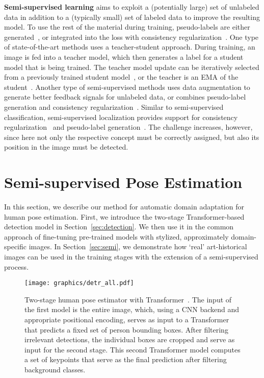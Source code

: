 \documentclass[sigconf]{acmart}
\begin{document}
\textbf{Semi-supervised learning} aims to exploit a (potentially large) set of unlabeled data in addition to a (typically small) set of labeled data to improve the resulting model.
To use the rest of the material during training, pseudo-labels are either generated~\cite{DBLP:conf/cvpr/XieLHL20, lee2013pseudo}, or integrated into the loss with consistency regularization~\cite{DBLP:conf/iclr/LaineA17, DBLP:journals/pami/MiyatoMKI19}. 
One type of state-of-the-art methods uses a teacher-student approach. 
During training, an image is fed into a teacher model, which then generates a label for a student model that is being trained. 
The teacher model update can be iteratively selected from a previously trained student model~\cite{DBLP:conf/cvpr/XieLHL20}, or the teacher is an \ac{EMA} of the student~\cite{DBLP:conf/iclr/TarvainenV17}. 
Another type of semi-supervised methods uses data augmentation to generate better feedback signals for unlabeled data, or combines pseudo-label generation and consistency regularization~\cite{DBLP:conf/nips/BerthelotCGPOR19, DBLP:conf/iclr/BerthelotCCKSZR20, DBLP:conf/nips/SohnBCZZRCKL20}. 
Similar to semi-supervised classification, semi-supervised localization provides support for consistency regularization~\cite{DBLP:conf/nips/JeongLKK19, DBLP:conf/wacv/TangRWXX21} and pseudo-label generation~\cite {DBLP:conf/iccv/Xu00WWWB021, DBLP:conf/cvpr/WangYZ0L18}. 
The challenge increases, however, since here not only the respective concept must be correctly assigned, but also its position in the image must be detected.



\section{Semi-supervised Pose Estimation}
\label{chp:method}

In this section, we describe our method for automatic domain adaptation for human pose estimation.
First, we introduce the two-stage Transformer-based detection model in Section~\ref{sec:detection}. We then use it in the common approach of fine-tuning pre-trained models with stylized, approximately domain-specific images.
In Section~\ref{sec:semi}, we demonstrate how \enquote*{real} art-historical images can be used in the training stages with the extension of a semi-supervised process.


\begin{figure*}
\begin{center}
\texttt{[image: graphics/detr\_all.pdf]}
\end{center}
\caption{Two-stage human pose estimator with Transformer~\cite{DBLP:conf/nips/VaswaniSPUJGKP17, DBLP:conf/eccv/CarionMSUKZ20}. 
The input of the first model is the entire image, which, using a \acf{CNN} backend and appropriate positional encoding, serves as input to a Transformer that predicts a fixed set of person bounding boxes. 
After filtering irrelevant detections, the individual boxes are cropped and serve as input for the second stage. 
This second Transformer model computes a set of keypoints that serve as the final prediction after filtering background classes.}
\label{fig:two_stages}
\end{figure*}
\end{document}
